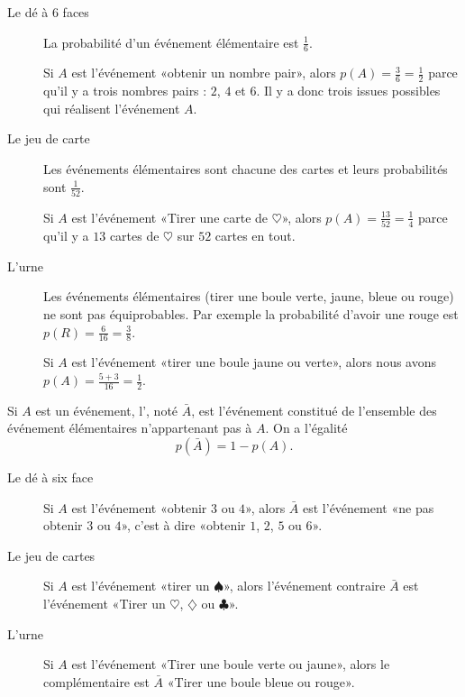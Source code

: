 \begin{example}
    \begin{description}
        \item[Le dé à 6 faces]
            La probabilité d'un événement élémentaire est \( \frac{1}{ 6 }\).

            Si \( A\) est l'événement «obtenir un nombre pair», alors \( p(A)=\frac{ 3 }{ 6 }=\frac{ 1 }{2}\) parce qu'il y a trois nombres pairs : \( 2\), \( 4\) et \( 6\). Il y a donc trois issues possibles qui réalisent l'événement \( A\).
        \item[Le jeu de carte]
            Les événements élémentaires sont chacune des cartes et leurs probabilités sont \( \frac{1}{ 52 }\). 
            
            
            Si \( A\) est l'événement «Tirer une carte de \( \heartsuit\)», alors \( p(A)=\frac{ 13 }{ 52 }=\frac{1}{ 4 }\) parce qu'il y a \( 13\) cartes de \( \heartsuit\) sur \( 52\) cartes en tout.

        \item[L'urne] Les événements élémentaires (tirer une boule verte, jaune, bleue ou rouge) ne sont pas équiprobables. Par exemple la probabilité d'avoir une rouge est \( p(R)=\frac{ 6 }{ 16 }=\frac{ 3 }{ 8 }\).

            Si \( A\) est l'événement «tirer une boule jaune ou verte», alors nous avons \( p(A)=\frac{ 5+3 }{ 16 }=\frac{ 1 }{ 2 }\).
    \end{description}
\end{example}

\begin{definition}
    Si \( A\) est un événement, l', noté \( \bar A\), est l'événement constitué de l'ensemble des événement élémentaires n'appartenant pas à \( A\). On a l'égalité
    \begin{equation}
        p(\bar A)=1-p(A).
    \end{equation}
\end{definition}

\begin{example}
    \begin{description}
        \item[Le dé à six face] Si \( A\) est l'événement «obtenir \( 3\) ou \( 4\)», alors \( \bar A\) est l'événement «ne pas obtenir \( 3\) ou \( 4\)», c'est à dire «obtenir \( 1\), \( 2\), \( 5\) ou \( 6\)».
        \item[Le jeu de cartes] Si \( A\) est l'événement «tirer un \( \spadesuit\)», alors l'événement contraire \( \bar A\) est l'événement «Tirer un \( \heartsuit\), \( \diamondsuit\) ou \( \clubsuit\)».
        \item[L'urne] Si \( A\) est l'événement «Tirer une boule verte ou jaune», alors le complémentaire est \( \bar A\) «Tirer une boule bleue ou rouge».
    \end{description}
\end{example}


